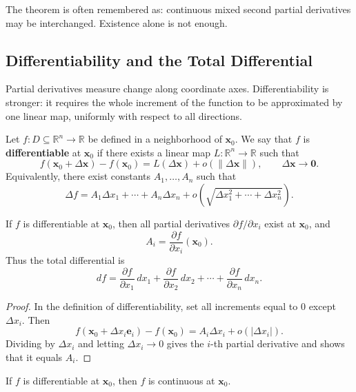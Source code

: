 \begin{note}
The theorem is often remembered as: continuous mixed second partial derivatives may be interchanged. Existence alone is not enough.
\end{note}

\subsection{Differentiability and the Total Differential}

Partial derivatives measure change along coordinate axes. Differentiability is stronger: it requires the whole increment of the function to be approximated by one linear map, uniformly with respect to all directions.

\begin{definition}[Differentiability]
Let $f:D\subseteq \mathbb{R}^n\to\mathbb{R}$ be defined in a neighborhood of $\mathbf{x}_0$. We say that $f$ is \textbf{differentiable} at $\mathbf{x}_0$ if there exists a linear map $L:\mathbb{R}^n\to\mathbb{R}$ such that
\[
    f(\mathbf{x}_0+\Delta\mathbf{x})-f(\mathbf{x}_0)
    =L(\Delta\mathbf{x})+o(\|\Delta\mathbf{x}\|),\qquad \Delta\mathbf{x}\to \mathbf{0}.
\]
Equivalently, there exist constants $A_1,\dots,A_n$ such that
\[
    \Delta f=A_1\Delta x_1+\cdots+A_n\Delta x_n+o\left(\sqrt{\Delta x_1^2+\cdots+\Delta x_n^2}\right).
\]
\end{definition}

\begin{theorem}
If $f$ is differentiable at $\mathbf{x}_0$, then all partial derivatives $\partial f/\partial x_i$ exist at $\mathbf{x}_0$, and
\[
    A_i=\frac{\partial f}{\partial x_i}(\mathbf{x}_0).
\]
Thus the total differential is
\[
    df=\frac{\partial f}{\partial x_1}\,dx_1+\frac{\partial f}{\partial x_2}\,dx_2+\cdots+\frac{\partial f}{\partial x_n}\,dx_n.
\]
\end{theorem}

\begin{proof}
In the definition of differentiability, set all increments equal to $0$ except $\Delta x_i$. Then
\[
    f(\mathbf{x}_0+\Delta x_i\mathbf{e}_i)-f(\mathbf{x}_0)
    =A_i\Delta x_i+o(|\Delta x_i|).
\]
Dividing by $\Delta x_i$ and letting $\Delta x_i\to0$ gives the $i$-th partial derivative and shows that it equals $A_i$.
\end{proof}

\begin{theorem}
If $f$ is differentiable at $\mathbf{x}_0$, then $f$ is continuous at $\mathbf{x}_0$.
\end{theorem}

